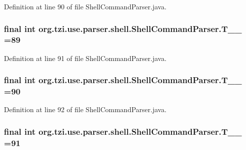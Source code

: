 Definition at line 90 of file Shell\-Command\-Parser.\-java.

\hypertarget{classorg_1_1tzi_1_1use_1_1parser_1_1shell_1_1_shell_command_parser_a1fe6f20ba2e24d18f2565d30b2ac135b}{
\subsubsection[{T\-\_\-\-\_\-89}]{\setlength{\rightskip}{0pt plus 5cm}final int org.\-tzi.\-use.\-parser.\-shell.\-Shell\-Command\-Parser.\-T\-\_\-\-\_ =89\hspace{0.3cm}{\ttfamily [static]}}}\label{classorg_1_1tzi_1_1use_1_1parser_1_1shell_1_1_shell_command_parser_a1fe6f20ba2e24d18f2565d30b2ac135b}


Definition at line 91 of file Shell\-Command\-Parser.\-java.

\hypertarget{classorg_1_1tzi_1_1use_1_1parser_1_1shell_1_1_shell_command_parser_a7a30a90b67baec9bcce764ef9f896442}{
\subsubsection[{T\-\_\-\-\_\-90}]{\setlength{\rightskip}{0pt plus 5cm}final int org.\-tzi.\-use.\-parser.\-shell.\-Shell\-Command\-Parser.\-T\-\_\-\-\_ =90\hspace{0.3cm}{\ttfamily [static]}}}\label{classorg_1_1tzi_1_1use_1_1parser_1_1shell_1_1_shell_command_parser_a7a30a90b67baec9bcce764ef9f896442}


Definition at line 92 of file Shell\-Command\-Parser.\-java.

\hypertarget{classorg_1_1tzi_1_1use_1_1parser_1_1shell_1_1_shell_command_parser_a29547e2db2ac94cd8cccbc247aa9f9ac}{
\subsubsection[{T\-\_\-\-\_\-91}]{\setlength{\rightskip}{0pt plus 5cm}final int org.\-tzi.\-use.\-parser.\-shell.\-Shell\-Command\-Parser.\-T\-\_\-\-\_ =91\hspace{0.3cm}{\ttfamily [static]}}}\label{classorg_1_1tzi_1_1use_1_1parser_1_1shell_1_1_shell_command_parser_a29547e2db2ac94cd8cccbc247aa9f9ac}



